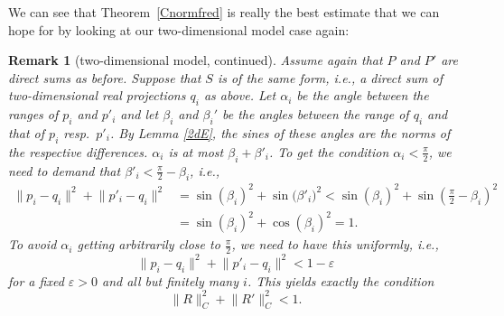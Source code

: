 \documentclass[pdftex]{sigma}
\numberwithin{equation}{section}
\newtheorem{Remark}[Theorem]{Remark} }
\DeclareMathOperator{\Ran}{Ran}
\begin{document}
	We can see that Theorem~\ref{Cnormfred} is really the best estimate that we can hope for by looking at our two-dimensional model case again: %
  \begin{figure}[ht]\centering
	\end{figure}

	\begin{Remark}[two-dimensional model, continued]
	 Assume again that $P$ and $P'$ are direct sums as before. Suppose that $S$ is of the same form, i.e., a direct sum of two-dimensional real projections $q_i$ as above.
	 Let $\alpha_i$ be the angle between the ranges of $p_i$ and $p'_i$ and let $\beta_i$ and $\beta_i'$ be the angles between the range of $q_i$ and that of $p_i$ resp.\ $p'_i$. By Lemma \ref{2dE}, the sines of these angles are the norms of the respective differences. $\alpha_i$ is at most $\beta_i+\beta'_i$. To get the condition $\alpha_i<\frac{\pi}{2}$, we need to demand that $\beta'_i<\frac{\pi}{2}-\beta_i$, i.e.,
\begin{align*}
\|p_i-q_i\|^2+\bigl\|p'_i-q_i\bigr\|^2& =\sin(\beta_i)^2+\sin\bigl(\beta'_i\bigr)^2<\sin(\beta_i)^2+ \sin\left(\frac{\pi}{2}-\beta_i\right)^2\\
& =\sin(\beta_i)^2+\cos(\beta_i)^2=1.
\end{align*}
	To avoid $\alpha_i$ getting arbitrarily close to $\frac{\pi}{2}$, we need to have this uniformly, i.e.,
\[
\|p_i-q_i\|^2+\bigl\|p'_i-q_i\bigr\|^2<1-\varepsilon
\]
for a fixed $\varepsilon>0$ and all but finitely many $i$. This yields exactly the condition
\[
\|R\|_C^2+\bigl\|R'\bigr\|_C^2<1.
\]
	\end{Remark}
\end{document}
